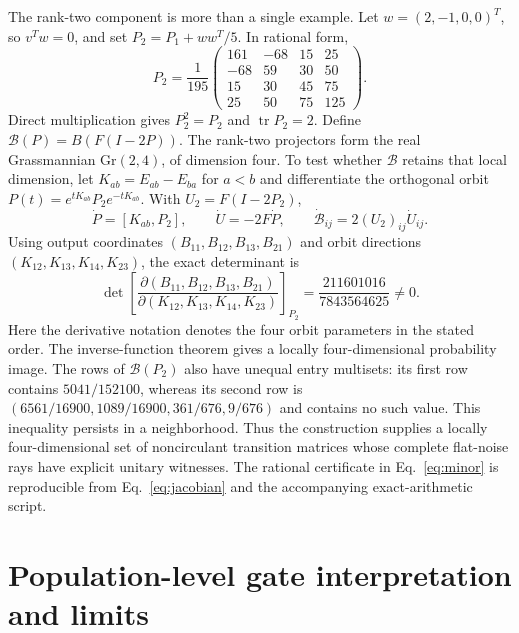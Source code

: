 \documentclass[aip,jmp,preprint]{revtex4-2}
\begin{document}
The rank-two component is more than a single example. Let $w=(2,-1,0,0)^T$, so $v^Tw=0$, and set $P_2=P_1+ww^T/5$. In rational form,
\begin{equation}
 P_2=\frac1{195}\begin{pmatrix}
 161&-68&15&25\\
 -68&59&30&50\\
 15&30&45&75\\
 25&50&75&125
 \end{pmatrix}.
 \label{eq:P2}
\end{equation}
Direct multiplication gives $P_2^2=P_2$ and $\operatorname{tr}P_2=2$. Define $\mathcal B(P)=B(F(I-2P))$. The rank-two projectors form the real Grassmannian $\mathrm{Gr}(2,4)$, of dimension four. To test whether $\mathcal B$ retains that local dimension, let $K_{ab}=E_{ab}-E_{ba}$ for $a<b$ and differentiate the orthogonal orbit $P(t)=e^{tK_{ab}}P_2e^{-tK_{ab}}$. With $U_2=F(I-2P_2)$,
\begin{equation}
 \dot P=[K_{ab},P_2],\qquad
 \dot U=-2F\dot P,\qquad
 \dot{\mathcal B}_{ij}=2(U_2)_{ij}\dot U_{ij}.
 \label{eq:jacobian}
\end{equation}
Using output coordinates $(B_{11},B_{12},B_{13},B_{21})$ and orbit directions $(K_{12},K_{13},K_{14},K_{23})$, the exact determinant is
\begin{equation}
 \det\!\left[\frac{\partial(B_{11},B_{12},B_{13},B_{21})}
 {\partial(K_{12},K_{13},K_{14},K_{23})}\right]_{P_2}
 =\frac{211601016}{7843564625}\ne0 .
 \label{eq:minor}
\end{equation}
Here the derivative notation denotes the four orbit parameters in the stated order. The inverse-function theorem gives a locally four-dimensional probability image. The rows of $\mathcal B(P_2)$ also have unequal entry multisets: its first row contains $5041/152100$, whereas its second row is $(6561/16900,1089/16900,361/676,9/676)$ and contains no such value. This inequality persists in a neighborhood. Thus the construction supplies a locally four-dimensional set of noncirculant transition matrices whose complete flat-noise rays have explicit unitary witnesses. The rational certificate in Eq.~\eqref{eq:minor} is reproducible from Eq.~\eqref{eq:jacobian} and the accompanying exact-arithmetic script.

\section{Population-level gate interpretation and limits}
\end{document}
